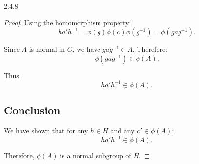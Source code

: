 \documentclass[12pt]{amsart}
\theoremstyle{definition}
\numberwithin{equation}{section}
\begin{document}
\begin{exercise}{2.4.8}
\begin{proof}
        Using the homomorphism property:
        \[
        h a' h^{-1} = \phi(g) \phi(a) \phi(g^{-1}) = \phi(g a g^{-1}).
        \]
        
        Since \(A\) is normal in \(G\), we have \(g a g^{-1} \in A\). Therefore:
        \[
        \phi(g a g^{-1}) \in \phi(A).
        \]
        
        Thus:
        \[
        h a' h^{-1} \in \phi(A).
        \]
        
        \subsection*{Conclusion}
        
        We have shown that for any \(h \in H\) and any \(a' \in \phi(A)\):
        \[
        h a' h^{-1} \in \phi(A).
        \]
        
        Therefore, \(\phi(A)\) is a normal subgroup of \(H\).
    \end{proof}
    
    \end{exercise}
    \newpage
    
\end{document}

